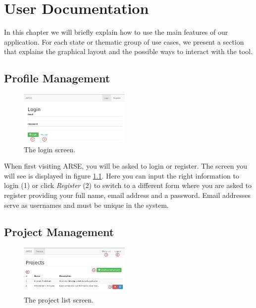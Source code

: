 \documentclass[
	accentcolor=tud1a %
]{tudreport}
\begin{document}
\chapter{User Documentation}
\label{ch:use-documentation}

In this chapter we will briefly explain how to use the main features of our application. For each state or thematic group of use cases, we present a section that explains the graphical layout and the possible ways to interact with the tool.

\section{Profile Management}
\label{sec:profile-mgmt}

\begin{figure}
  	\centering
	\includegraphics[width=0.48\textwidth]{img/login}
	\caption{The login screen.}
	\label{fig:login}
\end{figure}

When first visiting ARSE, you will be asked to login or register. The screen you will see is displayed in figure \ref{fig:login}. Here you can input the right information to login (1) or click \emph{Register} (2) to switch to a different form where you are asked to register providing your full name, email address and a password. Email addresses serve as usernames and must be unique in the system.

\section{Project Management}
\label{sec:project-mgmt}

\begin{figure}
	\centering
	\includegraphics[width=0.48\textwidth]{img/projects}
	\caption{The project list screen.}
	\label{fig:project-list}
\end{figure}
\end{document}

